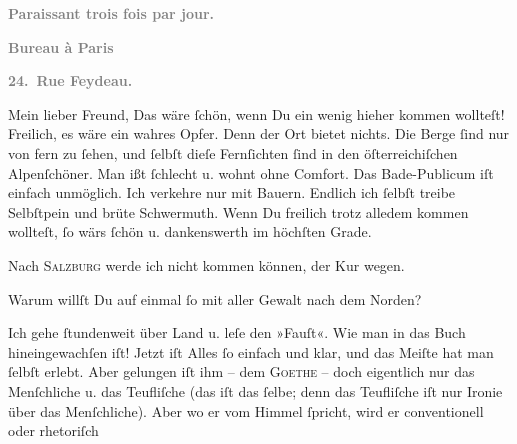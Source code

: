 \pstart
           \begin{otherlanguage}{french}\textcolor{gray}{\textbf{\textbf{Paraissant trois fois par jour.}}}\end{otherlanguage}\pend
           
\pstart
           \begin{otherlanguage}{french}\textcolor{gray}{\textbf{\textbf{Bureau à Paris}}}\end{otherlanguage}\pend
           
\pstart
           \begin{otherlanguage}{french}\textcolor{gray}{\textbf{\textbf{24. Rue Feydeau.}}}\end{otherlanguage}\pend
           
\pstart\center{}Mein lieber Freund,\pend\vspace{0.5em}
\pstart
           Das wäre{ }ſchön, wenn Du ein wenig hieher kommen wollteſt! Freilich, es wäre ein
               wahres Opfer. Denn der Ort
               bietet nichts. Die Berge{ }ſind nur von fern zu{ }ſehen, und{ }ſelbſt dieſe Fernſichten{ }ſind in den öſterreichiſchen Alpenſchöner. Man ißt{ }ſchlecht u. wohnt ohne Comfort. Das
               Bade-Publicum iſt einfach unmöglich. Ich verkehre nur mit Bauern. {\pb}Endlich ich{ }ſelbſt  treibe Selbſtpein und brüte Schwermuth. Wenn Du freilich trotz alledem kommen
               wollteſt,{ }ſo wärs{ }ſchön u. dankenswerth im höchſten Grade.\pend
           
\pstart
           Nach \textsc{Salzburg} werde ich nicht kommen können, der Kur wegen.\pend
           
\pstart
           Warum willſt Du auf einmal{ }ſo mit aller Gewalt nach dem Norden?\pend
           
\pstart
           Ich gehe{ }ſtundenweit über Land u. leſe den »Fauſt«. Wie man in das {\pb}Buch hineingewachſen iſt!
               Jetzt iſt Alles{ }ſo einfach und klar, und das Meiſte hat man{ }ſelbſt erlebt. Aber
               gelungen iſt ihm – dem \textsc{Goethe} – doch eigentlich nur das Menſchliche u. das Teufliſche (das iſt das{ }ſelbe;
               denn das Teufliſche iſt nur Ironie über das Menſchliche). Aber wo er vom Himmel{ }ſpricht, wird er conventionell oder rhetoriſch{\dotsfive}\pend
           
